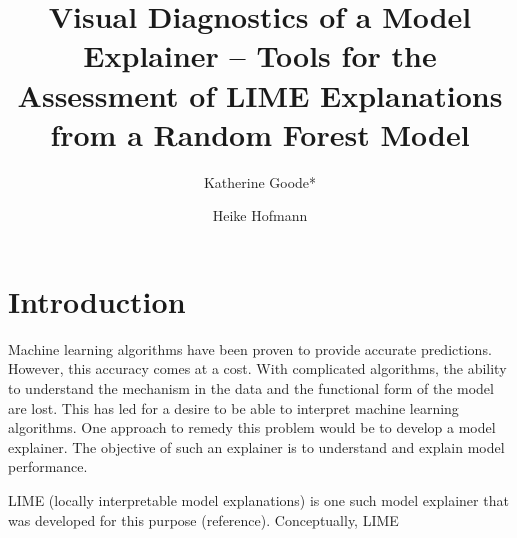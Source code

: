 \documentclass[AMS,STIX1COL]{WileyNJD-v2}
\begin{document}


\title{Visual Diagnostics of a Model Explainer -- Tools for the Assessment of LIME Explanations from a Random Forest Model}

\author[1]{Katherine Goode*}

\author[1,2]{Heike Hofmann}


\address[1]{, , }

\address[2]{, , }






\maketitle

\section{Introduction}

Machine learning algorithms have been proven to provide accurate predictions. However, this accuracy comes at a cost. With complicated algorithms, the ability to understand the mechanism in the data and the functional form of the model are lost. This has led for a desire to be able to interpret machine learning algorithms. One approach to remedy this problem would be to develop a model explainer. The objective of such an explainer is to understand and explain model performance.

LIME (locally interpretable model explanations) is one such model explainer that was developed for this purpose (reference). Conceptually, LIME 
\end{document}
